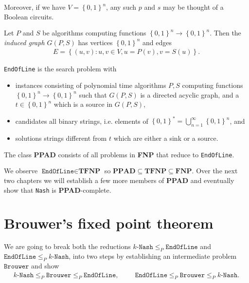 \documentclass{article}
\begin{document}
Moreover, if we have $V=\left\lbrace{0,1}\right\rbrace^n$,
any such $p$ and $s$ may be thought of a Boolean circuits.

\begin{definition}
  Let $P$ and $S$ be algorithms computing functions
  $\left\lbrace{0,1}\right\rbrace^n\to\left\lbrace{0,1}\right\rbrace^n$.
  Then the \emph{induced graph $G(P,S)$} has vertices $\left\lbrace{0,1}\right\rbrace^n$
  and edges
  \begin{align*}
    E = \left\lbrace{(u,v) : u,v\in V, u=P(v), v=S(u)}\right\rbrace.
  \end{align*}
\end{definition}

\begin{definition}
  \texttt{EndOfLine} is the search problem with
  \begin{itemize}
    \item instances consisting of polynomial time algorithms $P,S$
      computing functions $\left\lbrace{0,1}\right\rbrace^n\to\left\lbrace{0,1}\right\rbrace^n$ such that
      $G(P,S)$ is a directed acyclic graph, and a
      $t\in\left\lbrace{0,1}\right\rbrace^n$ which is a source in $G(P,S)$,
    \item candidates all binary strings, i.e. elements of
      $\left\lbrace{0,1}\right\rbrace^* = \bigcup_{n=1}^\infty \left\lbrace{0,1}\right\rbrace^n$, and
    \item solutions strings different from $t$ which are either a sink or
      a source.
  \end{itemize}
\end{definition}

\begin{definition}
  The class \textbf{PPAD} consists of all problems in \textbf{FNP}
  that reduce to \texttt{EndOfLine}.
\end{definition}

We observe $\texttt{EndOfLine}\in\textbf{TFNP}$ so
$\textbf{PPAD}\subseteq\textbf{TFNP}\subseteq\textbf{FNP}$.
Over the next two chapters we will establish a few more members
of \textbf{PPAD} and eventually show that \texttt{Nash} is
\textbf{PPAD}-complete.

\section{Brouwer's fixed point theorem}

We are going to break both the reductions
$k\texttt{-Nash}\leq_P\texttt{EndOfLine}$ and
$\texttt{EndOfLine}\leq_P k\texttt{-Nash}$, into two steps by
establishing an intermediate problem $\texttt{Brouwer}$ and show
\begin{align*}
  k\texttt{-Nash}\leq_P\texttt{Brouwer}\leq_P\texttt{EndOfLine},
  \hspace{1cm}
  \texttt{EndOfLine}\leq_P \texttt{Brouwer}\leq_P k\texttt{-Nash}.
\end{align*}
\end{document}
